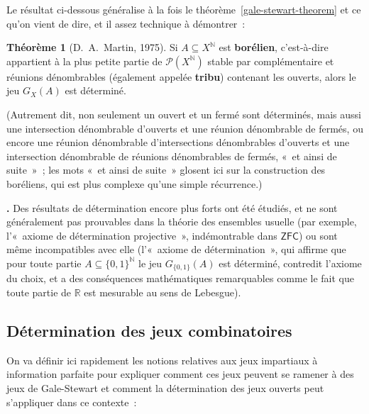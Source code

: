 \documentclass[12pt,a4paper]{article}
\theoremstyle{definition}
\newcommand\thingy{%
\refstepcounter{comcnt}\smallskip\noindent\textbf{\thecomcnt.} }
\newtheorem{thm}[comcnt]{Théorème}
\newcommand{\defin}[2][]{\def\latexsucks{#1}\ifx\latexsucks\empty\index{#2}\else\index{\latexsucks}\fi\textbf{#2}}
\begin{document}
Le résultat ci-dessous généralise à la fois le
théorème \ref{gale-stewart-theorem} et ce qu'on vient de dire, et il
assez technique à démontrer :

\begin{thm}[D. A. Martin, 1975]
Si $A \subseteq X^{\mathbb{N}}$ est \defin{borélien}, c'est-à-dire
appartient à la plus petite partie de $\mathscr{P}(X^{\mathbb{N}})$
stable par complémentaire et réunions dénombrables (également appelée
\defin{tribu}) contenant les ouverts, alors le jeu $G_X(A)$ est déterminé.
\end{thm}

(Autrement dit, non seulement un ouvert et un fermé sont déterminés,
mais aussi une intersection dénombrable d'ouverts et une réunion
dénombrable de fermés, ou encore une réunion dénombrable
d'intersections dénombrables d'ouverts et une intersection dénombrable
de réunions dénombrables de fermés, « et ainsi de suite » ; les mots
« et ainsi de suite » glosent ici sur la construction des boréliens,
qui est plus complexe qu'une simple récurrence.)

\thingy Des résultats de détermination encore plus forts ont été
étudiés, et ne sont généralement pas prouvables dans la théorie des
ensembles usuelle (par exemple, l'« axiome de détermination
  projective », indémontrable dans $\mathsf{ZFC}$) ou sont même
incompatibles avec elle (l'« axiome de détermination », qui affirme
que pour toute partie $A \subseteq \{0,1\}^{\mathbb{N}}$ le jeu
$G_{\{0,1\}}(A)$ est déterminé, contredit l'axiome du choix, et a des
conséquences mathématiques remarquables comme le fait que toute partie
de $\mathbb{R}$ est mesurable au sens de Lebesgue).


\subsection{Détermination des jeux combinatoires}\label{subsection-determinacy-of-perfect-information-games}

On va définir ici rapidement les notions relatives aux jeux impartiaux
à information parfaite pour expliquer comment ces jeux peuvent se
ramener à des jeux de Gale-Stewart et comment la détermination des
jeux ouverts peut s'appliquer dans ce contexte :
\end{document}
